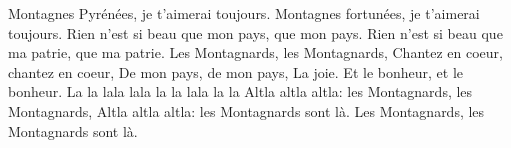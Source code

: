 
\beginverse
Montagnes Pyrénées, je t’aimerai toujours.
Montagnes fortunées, je t’aimerai toujours.
Rien n’est si beau que mon pays, que mon pays.
Rien n’est si beau que ma patrie, que ma patrie. 
Les Montagnards, les Montagnards,
Chantez en coeur, chantez en coeur,
De mon pays, de mon pays, 
La joie. Et le bonheur, et le bonheur.
La la lala lala la la lala la la
\endverse
\beginchorus
Altla altla altla: les Montagnards, les Montagnards,
Altla altla altla: les Montagnards sont là.
Les Montagnards, les Montagnards sont là.
\endchorus
\endsong